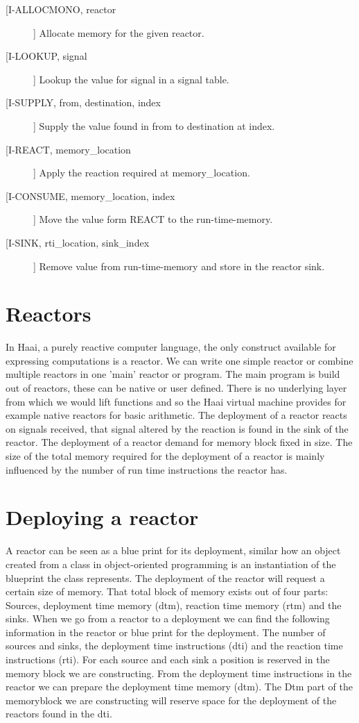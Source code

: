 \documentclass[a4paper]{book}
\begin{document}
\begin{description}
	\item[[I-ALLOCMONO, reactor]] Allocate memory for the given reactor.
	\item[[I-LOOKUP, signal]] Lookup the value for signal in a signal table.
	\item[[I-SUPPLY, from, destination, index]] Supply the value found in from to destination at index.
	\item[[I-REACT, memory\_location]] Apply the reaction required at memory\_location.
	\item[[I-CONSUME, memory\_location, index]] Move the value form REACT to the run-time-memory.
	\item[[I-SINK, rti\_location, sink\_index]] Remove value from run-time-memory and store in the reactor sink.
\end{description}

\section{Reactors}
In Haai, a purely reactive computer language, the only construct available for expressing computations is a reactor. We can write one simple reactor or combine multiple reactors in one 'main' reactor or program. The main program is build out of reactors, these can be native or user defined. There is no underlying layer from which we would lift functions and so the Haai virtual machine provides for example native reactors for basic arithmetic. The deployment of a reactor reacts on signals received, that signal altered by the reaction is found in the sink of the reactor. The deployment of a reactor demand for memory block fixed in size. The size of the total memory required for the deployment of a reactor is mainly influenced by the number of run time instructions the reactor has.  
\section{Deploying a reactor}
A reactor can be seen as a blue print for its deployment, similar how an object created from a class in object-oriented programming is an instantiation of the blueprint the class represents. The deployment of the reactor will request a certain size of memory. That total block of memory exists out of four parts: Sources, deployment time memory (dtm), reaction time memory (rtm) and the sinks. When we go from a reactor to a deployment we can find the following information in the reactor or blue print for the deployment. The number of sources and sinks, the deployment time instructions (dti) and the reaction time instructions (rti). For each source and each sink a position is reserved in the memory block we are constructing. From the deployment time instructions in the reactor we can prepare the deployment time memory (dtm). The Dtm part of the memoryblock we are constructing will reserve space for the deployment of the reactors found in the dti. 
\end{document}
